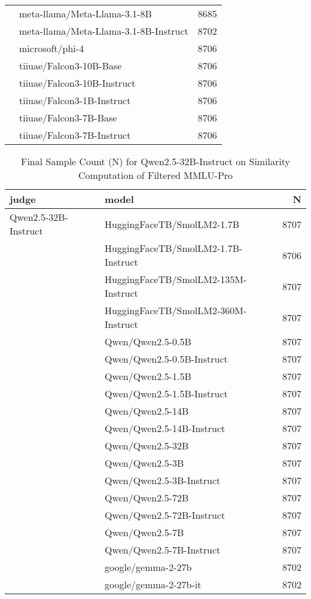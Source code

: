 \begin{table}[!htbp]
\begin{tabular}{llr}
 & meta-llama/Meta-Llama-3.1-8B & 8685 \\
 & meta-llama/Meta-Llama-3.1-8B-Instruct & 8702 \\
 & microsoft/phi-4 & 8706 \\
 & tiiuae/Falcon3-10B-Base & 8706 \\
 & tiiuae/Falcon3-10B-Instruct & 8706 \\
 & tiiuae/Falcon3-1B-Instruct & 8706 \\
 & tiiuae/Falcon3-7B-Base & 8706 \\
 & tiiuae/Falcon3-7B-Instruct & 8706 \\
\bottomrule
\end{tabular}
    \label{tab:Qwen2.5-7B-Instruct}
\end{table}

\begin{table}[]
    \centering
    \caption{Final Sample Count (N) for Qwen2.5-32B-Instruct on Similarity Computation of Filtered MMLU-Pro}
    \begin{tabular}{llr}
\toprule
judge & model & N \\
\midrule
Qwen2.5-32B-Instruct & HuggingFaceTB/SmolLM2-1.7B & 8707 \\
 & HuggingFaceTB/SmolLM2-1.7B-Instruct & 8706 \\
 & HuggingFaceTB/SmolLM2-135M-Instruct & 8707 \\
 & HuggingFaceTB/SmolLM2-360M-Instruct & 8707 \\
 & Qwen/Qwen2.5-0.5B & 8707 \\
 & Qwen/Qwen2.5-0.5B-Instruct & 8707 \\
 & Qwen/Qwen2.5-1.5B & 8707 \\
 & Qwen/Qwen2.5-1.5B-Instruct & 8707 \\
 & Qwen/Qwen2.5-14B & 8707 \\
 & Qwen/Qwen2.5-14B-Instruct & 8707 \\
 & Qwen/Qwen2.5-32B & 8707 \\
 & Qwen/Qwen2.5-3B & 8707 \\
 & Qwen/Qwen2.5-3B-Instruct & 8707 \\
 & Qwen/Qwen2.5-72B & 8707 \\
 & Qwen/Qwen2.5-72B-Instruct & 8707 \\
 & Qwen/Qwen2.5-7B & 8707 \\
 & Qwen/Qwen2.5-7B-Instruct & 8707 \\
 & google/gemma-2-27b & 8702 \\
 & google/gemma-2-27b-it & 8702 \\

\end{tabular}
\end{table}
